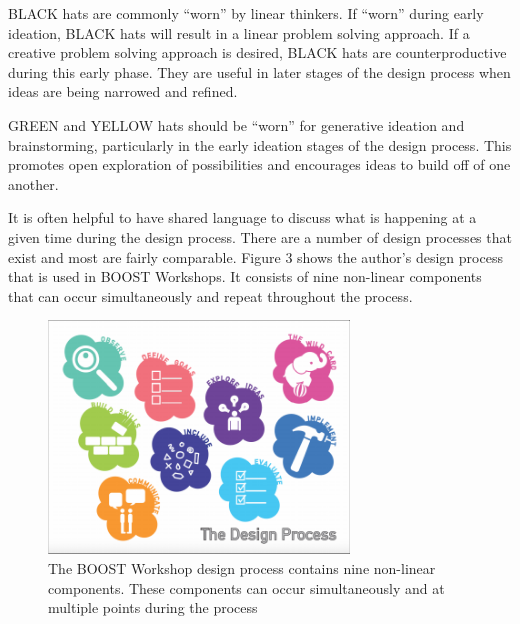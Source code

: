 \documentclass[11.5pt]{sig-alternate} %
\begin{document}
\begin{large}
BLACK hats are commonly “worn” by linear thinkers. If “worn” during early ideation, BLACK hats will result in a linear problem solving approach. If a creative problem solving approach is desired, BLACK hats are counterproductive during this early phase. They are useful in later stages of the design process when ideas are being narrowed and refined. 

GREEN and YELLOW hats should be “worn” for generative ideation and brainstorming, particularly in the early ideation stages of the design process. This promotes open exploration of possibilities and encourages ideas to build off of one another.     

It is often helpful to have shared language to discuss what is happening at a given time during the design process. There are a number of design processes that exist and most are fairly comparable. Figure 3 shows the author’s design process that is used in BOOST Workshops. It consists of nine non-linear components that can occur simultaneously and repeat throughout the process.

\begin{figure}[h]
    \centering
    \includegraphics[width=8cm]{figure3.png}
    \caption{The BOOST Workshop design process contains nine non-linear components. These components can occur simultaneously and at multiple points during the process}
\end{figure}


\end{large}
\end{document}
